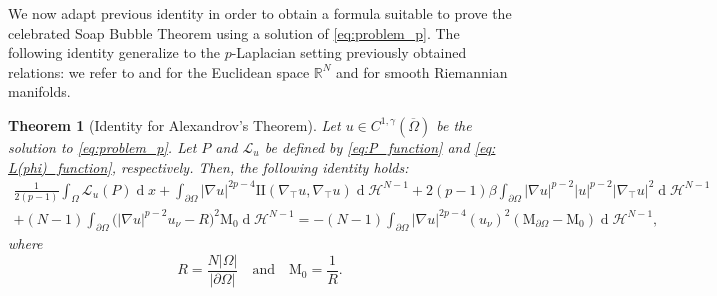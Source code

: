\documentclass[10pt,a4paper]{amsart}
\numberwithin{equation}{section}
\newcommand{\R}{\mathbb{R}}
\newtheorem{teo}{Theorem}[section]
\renewcommand{\d}[1]{\ensuremath{\operatorname{d}\!{#1}}}
\begin{document}
We now adapt previous identity in order to obtain a formula suitable to prove the celebrated Soap Bubble Theorem using a solution of \eqref{eq:problem_p}. The following identity generalize to the $p$-Laplacian setting previously obtained relations: we refer to \cite[Thm. 4]{gamo26} and \cite[Thm. 2.2]{mapo19} for the Euclidean space $\R^N$ and \cite{RuHuCh24} for smooth Riemannian manifolds.

\begin{teo}[Identity for Alexandrov's Theorem] \label{teo: identity soap}
Let $u \in C^{1,\gamma}(\overline{\Omega})$ be the solution to \eqref{eq:problem_p}. Let $P$ and $\mathcal{L}_u$ be defined by \eqref{eq:P_function} and \eqref{eq: L(phi)_function}, respectively. Then, the following identity holds:
\begin{equation*}
    \begin{aligned}
    \frac{1}{2(p-1)}\int_\Omega \mathcal{L}_u(P) \d{x} 
    +\int_{\partial\Omega} |\nabla u|^{2p-4} \mathrm{I\!I}(\nabla_\top u,\nabla_\top u) \d{}\mathcal{H}^{N-1}
    + 2(p-1)\beta \int_{\partial\Omega} |\nabla u|^{p-2}|u|^{p-2}|\nabla_\top u|^2 \d{}\mathcal{H}^{N-1} 
    \\
    + (N-1) \int_{\partial\Omega} \Big(|\nabla u|^{p-2} u_\nu - R \Big)^2  \mathrm{M}_{0} \d{}\mathcal{H}^{N-1} 
    =
    - (N-1) \int_{\partial\Omega} |\nabla u|^{2p-4} (u_\nu)^2 (\mathrm{M}_{\partial\Omega} - \mathrm{M}_{0} ) \d{}\mathcal{H}^{N-1},  
    \end{aligned}
\end{equation*}
where
\begin{equation*}
    R = \frac{N|\Omega|}{|\partial\Omega|} \quad\text{and} \quad \mathrm{M}_0 = \frac{1}{R}. 
\end{equation*}
\end{teo}
\end{document}
